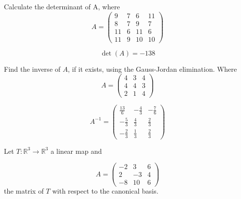 \begin{questions}

\question Calculate the determinant of A, where
$$
A=\left(\begin{array}{rrrr}
9 & 7 & 6 & 11 \\
8 & 7 & 9 & 7 \\
11 & 6 & 11 & 6 \\
11 & 9 & 10 & 10
\end{array}\right)
$$

\begin{solution}
$$\det(A)=-138$$
\end{solution}

\question Find the inverse of $A$, if it exists, using the Gauss-Jordan elimination. Where
$$
A=\left(\begin{array}{rrr}
4 & 3 & 4 \\
4 & 4 & 3 \\
2 & 1 & 4
\end{array}\right)
$$

\begin{solution}
$$A^{-1}=\left(\begin{array}{rrr}
\frac{13}{6} & -\frac{4}{3} & -\frac{7}{6} \\
-\frac{5}{3} & \frac{4}{3} & \frac{2}{3} \\
-\frac{2}{3} & \frac{1}{3} & \frac{2}{3}
\end{array}\right)$$
\end{solution}

\question Let $T:\mathbb{R}^3\rightarrow\mathbb{R}^3$  a linear map and
 
$$
A=\left(\begin{array}{rrr}
-2 & 3 & 6 \\
2 & -3 & 4 \\
-8 & 10 & 6
\end{array}\right)
$$
the matrix of $T$ with respect to the canonical basis.
\end{questions}

